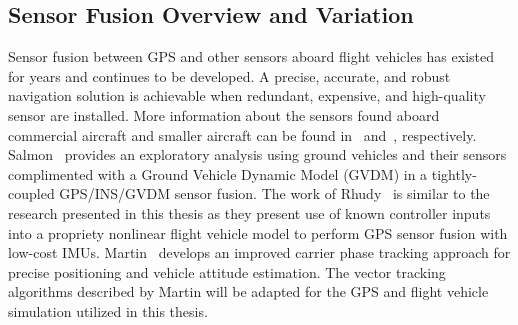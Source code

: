 \subsection{Sensor Fusion Overview and Variation}
Sensor fusion between GPS and other sensors aboard flight vehicles has existed for years and continues to be developed. A precise, accurate, and robust navigation solution is achievable when redundant, expensive, and high-quality sensor are installed. More information about the sensors found aboard commercial aircraft and smaller aircraft can be found in~\cite{airbuscustomerservicesAirbusA380Aircraft2020} and~\cite{DiamondAircraftDA40}, respectively. Salmon~\cite{salmonExperimentalExplorationLowCost2015} provides an exploratory analysis using ground vehicles and their sensors complimented with a Ground Vehicle Dynamic Model (GVDM) in a tightly-coupled GPS/INS/GVDM sensor fusion. The work of Rhudy~\cite{rhudyDynamicModelaidedSensor2017} is similar to the research presented in this thesis as they present use of known controller inputs into a propriety nonlinear flight vehicle model to perform GPS sensor fusion with low-cost IMUs. Martin~\cite{martinGPSCarrierPhase2017} develops an improved carrier phase tracking approach for precise positioning and vehicle attitude estimation. The vector tracking algorithms described by Martin will be adapted for the GPS and flight vehicle simulation utilized in this thesis.

